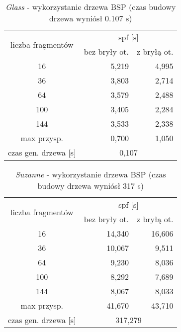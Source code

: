 	\begin{longtable}{|c|r|r|}
		\caption{\emph{Glass} - wykorzystanie drzewa BSP (czas budowy drzewa wyniósł 0.107 s)} \\ \hline
	    \multirow{2}{*}{liczba fragmentów} & \multicolumn{2}{|c|}{spf [s]} \\ \cline{2-3}
	    & bez bryły ot. & z bryłą ot. \\ \hline
	    16 & 5,219 & 4,995 \\ 
	    36 & 3,803 & 2,714 \\
		64 & 3,579 & 2,488 \\
		100 & 3,405 & 2,284 \\
		144 & 3,533 & 2,338 \\ \hline
		max przysp. & 0,700 & 1,050 \\ \hline
		czas gen. drzewa [s] &  \multicolumn{2}{|c|}{0,107} \\ \hline
	\end{longtable}
	
	
	\begin{longtable}{|c|r|r|}
		\caption{\emph{Suzanne} - wykorzystanie drzewa BSP (czas budowy drzewa wyniósł 317 s)} \\ \hline
	    \multirow{2}{*}{liczba fragmentów} & \multicolumn{2}{|c|}{spf [s]} \\ \cline{2-3}
	    & bez bryły ot. & z bryłą ot. \\ \hline
	    16 & 14,340 & 16,606 \\ 
	    36 & 10,067 & 9,511 \\
		64 & 9,230 & 8,036 \\
		100 & 8,292 & 7,689 \\
		144 & 8,067 & 8,033 \\ \hline
		max przysp. & 41,670 & 43,710 \\ \hline
		czas gen. drzewa [s] &  \multicolumn{2}{|c|}{317,279} \\ \hline
	\end{longtable}
	
	
%
%


